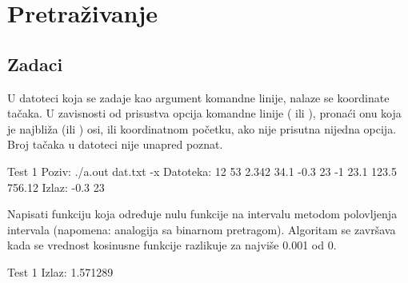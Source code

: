 
\chapter{Pretraživanje}

\section{Zadaci}

\begin{Exercise}[label=401]
  U datoteci koja se zadaje kao argument komandne linije, nalaze se
  koordinate tačaka. U zavisnosti od prisustva opcija komandne linije
  ( ili ), pronaći onu koja je najbliža 
  (ili ) osi, ili koordinatnom početku, ako nije prisutna
  nijedna opcija. Broj tačaka u datoteci nije unapred poznat.
  
\begin{miditest}
\begin{test}{Test 1}
Poziv: ./a.out dat.txt -x
Datoteka:
12 53
2.342 34.1
-0.3 23
-1 23.1
123.5 756.12
Izlaz: -0.3 23
\end{test}
\end{miditest}
  
\end{Exercise}

\begin{Answer}[ref=401]
\end{Answer}
\begin{Exercise}[label=402]
  Napisati funkciju koja određuje nulu funkcije  na
  intervalu \argf{[0,2]} metodom polovljenja intervala (napomena:
  analogija sa binarnom pretragom). Algoritam se završava kada se
  vrednost kosinusne funkcije razlikuje za najviše 0.001 od 0.
  
\begin{minitest}
\begin{test}{Test 1}
Izlaz:
1.571289
\end{test}
\end{minitest}
  
\end{Exercise}

